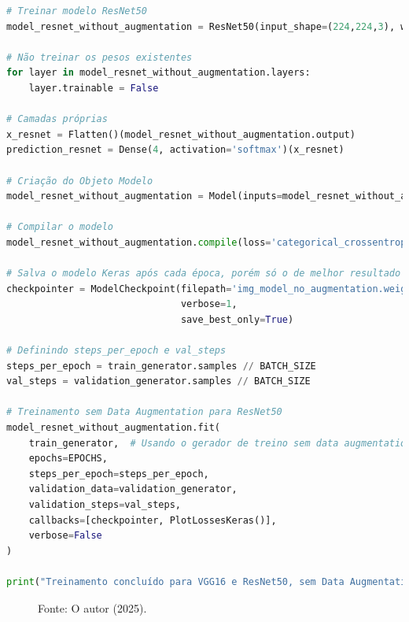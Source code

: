 \begin{lstlisting}[language=Python, style=input]
# Treinar modelo ResNet50
model_resnet_without_augmentation = ResNet50(input_shape=(224,224,3), weights='imagenet', include_top=False)

# Não treinar os pesos existentes
for layer in model_resnet_without_augmentation.layers:
    layer.trainable = False

# Camadas próprias
x_resnet = Flatten()(model_resnet_without_augmentation.output)
prediction_resnet = Dense(4, activation='softmax')(x_resnet)

# Criação do Objeto Modelo
model_resnet_without_augmentation = Model(inputs=model_resnet_without_augmentation.input, outputs=prediction_resnet)

# Compilar o modelo
model_resnet_without_augmentation.compile(loss='categorical_crossentropy', optimizer=RMSprop(learning_rate=0.0001), metrics=['accuracy'])

# Salva o modelo Keras após cada época, porém só o de melhor resultado
checkpointer = ModelCheckpoint(filepath='img_model_no_augmentation.weights.best.keras',
                               verbose=1,
                               save_best_only=True)

# Definindo steps_per_epoch e val_steps
steps_per_epoch = train_generator.samples // BATCH_SIZE
val_steps = validation_generator.samples // BATCH_SIZE

# Treinamento sem Data Augmentation para ResNet50
model_resnet_without_augmentation.fit(
    train_generator,  # Usando o gerador de treino sem data augmentation
    epochs=EPOCHS,
    steps_per_epoch=steps_per_epoch,
    validation_data=validation_generator,
    validation_steps=val_steps,
    callbacks=[checkpointer, PlotLossesKeras()],
    verbose=False
)

print("Treinamento concluído para VGG16 e ResNet50, sem Data Augmentation.")
\end{lstlisting}
\begin{figure}[h!]
\centering
\caption{Acurácia e perda ResNet50 sem data augmentation}
\hspace*{-2cm} %
\caption*{Fonte: O autor (2025).}
\end{figure}

